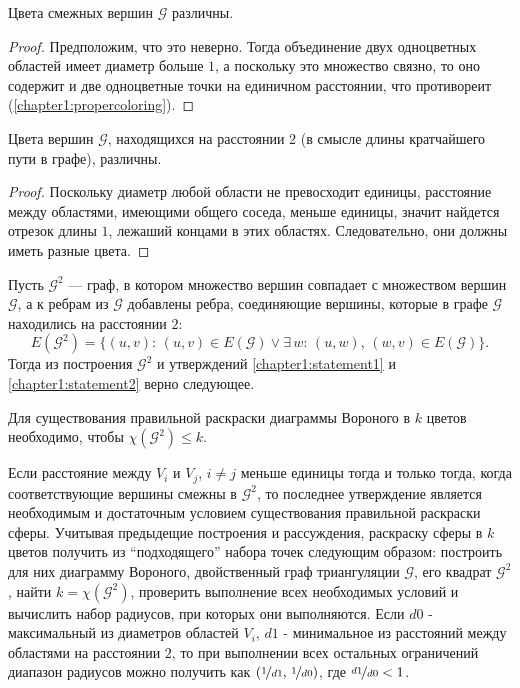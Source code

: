 \begin{statement}\label{chapter1:statement1}
Цвета смежных вершин $\mathcal{G}$ различны. 
\end{statement}

\begin{proof}
Предположим, что это неверно. Тогда объединение двух одноцветных областей имеет диаметр больше $1$, а поскольку это множество связно, то оно содержит и две одноцветные точки на единичном расстоянии, что противореит (\ref{chapter1:propercoloring}).
\end{proof}
 
\begin{statement}\label{chapter1:statement2}
Цвета вершин $\mathcal{G}$, находящихся на расстоянии $2$ (в смысле длины кратчайшего пути в графе), различны. 
\end{statement}

\begin{proof}
Поскольку диаметр любой области не превосходит единицы, расстояние между областями, имеющими общего соседа, меньше единицы,
значит найдется отрезок длины $1$, лежаший концами в этих областях. Следовательно, они должны иметь разные цвета.
\end{proof}

Пусть $\mathcal{G}^2$  — граф, в котором множество вершин совпадает с множеством вершин $\mathcal{G}$, 
а к ребрам из $\mathcal{G}$  добавлены ребра, соединяющие вершины, 
которые в графе $\mathcal{G}$ находились на расстоянии $2$:
$$E(\mathcal{G}^2) = \{ (u,v): \, (u,v) \in E(\mathcal{G}) \lor \exists \, w: \, (u,w),\,(w,v) \in E(\mathcal{G}) \}.$$
Тогда из построения $\mathcal{G}^2$ и утверждений 
\ref{chapter1:statement1} и \ref{chapter1:statement2} верно следующее.

\begin{statement}
Для существования правильной раскраски диаграммы Вороного в $k$ цветов необходимо, чтобы $\chi(\mathcal{G}^2) \leq k$.
\end{statement}

Если расстояние между $V_i$ и $V_j$, $i \neq j$ меньше единицы тогда и только тогда, 
когда соответствующие вершины смежны в $\mathcal{G}^2$, то последнее утверждение является необходимым и достаточным условием существования правильной раскраски сферы. Учитывая предыдещие построения и рассуждения, 
раскраску сферы в $k$ цветов получить из \enquote{подходящего} набора точек следующим образом: 
построить для них диаграмму Вороного, двойственный граф триангуляции $\mathcal{G}$, его квадрат $\mathcal{G}^2$, 
найти $k = \chi(\mathcal{G}^2)$, проверить выполнение всех необходимых условий и вычислить набор радиусов, 
при которых они выполняются. Если $d0$ - максимальный из диаметров областей $V_i$, $d1$ - минимальное из расстояний между областями на расстоянии $2$, то при выполнении всех остальных ограничений диапазон радиусов можно получить как 
$\left( \nicefrac{1}{d1}, \, \nicefrac{1}{d0} \right)$, где $\nicefrac{d1}{d0} < 1$.

